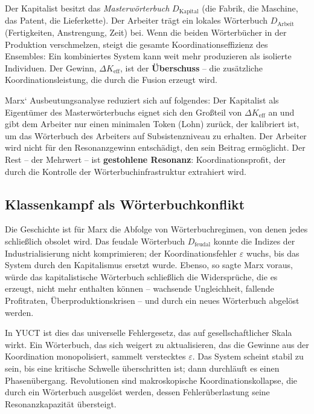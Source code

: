 \documentclass[12pt,a4paper]{article}
\newcommand{\Keff}{K_{\mathrm{eff}}}
\begin{document}
Der Kapitalist besitzt das \emph{Masterwörterbuch} \(D_{\text{Kapital}}\) (die Fabrik, die Maschine, das Patent, die Lieferkette). Der Arbeiter trägt ein lokales Wörterbuch \(D_{\text{Arbeit}}\) (Fertigkeiten, Anstrengung, Zeit) bei. Wenn die beiden Wörterbücher in der Produktion verschmelzen, steigt die gesamte Koordinationseffizienz des Ensembles: Ein kombiniertes System kann weit mehr produzieren als isolierte Individuen. Der Gewinn, \(\Delta\Keff\), ist der \textbf{Überschuss} – die zusätzliche Koordinationsleistung, die durch die Fusion erzeugt wird.

Marx‘ Ausbeutungsanalyse reduziert sich auf folgendes: Der Kapitalist als Eigentümer des Masterwörterbuchs eignet sich den Großteil von \(\Delta\Keff\) an und gibt dem Arbeiter nur einen minimalen Token (Lohn) zurück, der kalibriert ist, um das Wörterbuch des Arbeiters auf Subsistenzniveau zu erhalten. Der Arbeiter wird nicht für den Resonanzgewinn entschädigt, den sein Beitrag ermöglicht. Der Rest – der Mehrwert – ist \textbf{gestohlene Resonanz}: Koordinationsprofit, der durch die Kontrolle der Wörterbuchinfrastruktur extrahiert wird.

\subsection{Klassenkampf als Wörterbuchkonflikt}

Die Geschichte ist für Marx die Abfolge von Wörterbuchregimen, von denen jedes schließlich obsolet wird. Das feudale Wörterbuch \(D_{\text{feudal}}\) konnte die Indizes der Industrialisierung nicht komprimieren; der Koordinationsfehler \(\varepsilon\) wuchs, bis das System durch den Kapitalismus ersetzt wurde. Ebenso, so sagte Marx voraus, würde das kapitalistische Wörterbuch schließlich die Widersprüche, die es erzeugt, nicht mehr enthalten können – wachsende Ungleichheit, fallende Profitraten, Überproduktionskrisen – und durch ein neues Wörterbuch abgelöst werden.

In YUCT ist dies das universelle Fehlergesetz, das auf gesellschaftlicher Skala wirkt. Ein Wörterbuch, das sich weigert zu aktualisieren, das die Gewinne aus der Koordination monopolisiert, sammelt verstecktes \(\varepsilon\). Das System scheint stabil zu sein, bis eine kritische Schwelle überschritten ist; dann durchläuft es einen Phasenübergang. Revolutionen sind makroskopische Koordinationskollapse, die durch ein Wörterbuch ausgelöst werden, dessen Fehlerüberlastung seine Resonanzkapazität übersteigt.
\end{document}
